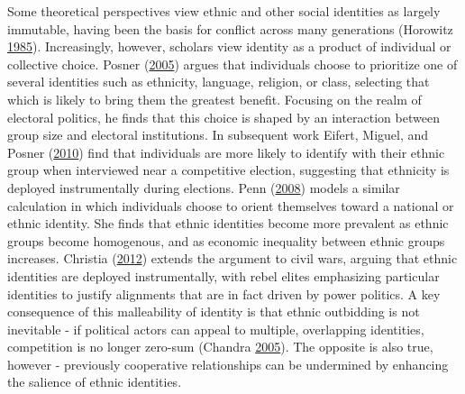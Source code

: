 \documentclass[12pt,]{book}
\theoremstyle{definition}
\theoremstyle{definition}
\theoremstyle{definition}
\theoremstyle{remark}
\begin{document}
Some theoretical perspectives view ethnic and other social identities as
largely immutable, having been the basis for conflict across many
generations (Horowitz \protect\hyperlink{ref-horowitz85}{1985}).
Increasingly, however, scholars view identity as a product of individual
or collective choice. Posner (\protect\hyperlink{ref-Posner2005}{2005})
argues that individuals choose to prioritize one of several identities
such as ethnicity, language, religion, or class, selecting that which is
likely to bring them the greatest benefit. Focusing on the realm of
electoral politics, he finds that this choice is shaped by an
interaction between group size and electoral institutions. In subsequent
work Eifert, Miguel, and Posner
(\protect\hyperlink{ref-Eifert2010}{2010}) find that individuals are
more likely to identify with their ethnic group when interviewed near a
competitive election, suggesting that ethnicity is deployed
instrumentally during elections. Penn
(\protect\hyperlink{ref-Penn2008}{2008}) models a similar calculation in
which individuals choose to orient themselves toward a national or
ethnic identity. She finds that ethnic identities become more prevalent
as ethnic groups become homogenous, and as economic inequality between
ethnic groups increases. Christia
(\protect\hyperlink{ref-Christia2012}{2012}) extends the argument to
civil wars, arguing that ethnic identities are deployed instrumentally,
with rebel elites emphasizing particular identities to justify
alignments that are in fact driven by power politics. A key consequence
of this malleability of identity is that ethnic outbidding is not
inevitable - if political actors can appeal to multiple, overlapping
identities, competition is no longer zero-sum (Chandra
\protect\hyperlink{ref-Chandra2005}{2005}). The opposite is also true,
however - previously cooperative relationships can be undermined by
enhancing the salience of ethnic identities.
\end{document}
